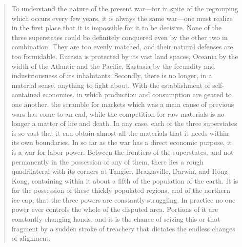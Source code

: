 \begin{quotation}
To understand the nature of the present war---for in spite of the
regrouping which occurs every few years, it is always the same war---one
must realize in the first place that it is impossible for it to be
decisive. None of the three superstates could be definitely conquered
even by the other two in combination. They are too evenly matched, and
their natural defenses are too formidable. Eurasia is protected by its
vast land spaces, Oceania by the width of the Atlantic and the Pacific,
Eastasia by the fecundity and industriousness of its inhabitants.
Secondly, there is no longer, in a material sense, anything to fight
about. With the establishment of self-contained economies, in which
production and consumption are geared to one another, the scramble for
markets which was a main cause of previous wars has come to an end,
while the competition for raw materials is no longer a matter of life
and death. In any case, each of the three superstates is so vast that it
can obtain almost all the materials that it needs within its own
boundaries. In so far as the war has a direct economic purpose, it is a
war for labor power. Between the frontiers of the superstates, and not
permanently in the possession of any of them, there lies a rough
quadrilateral with its corners at Tangier, Brazzaville, Darwin, and Hong
Kong, containing within it about a fifth of the population of the earth.
It is for the possession of these thickly populated regions, and of the
northern ice cap, that the three powers are constantly struggling. In
practice no one power ever controls the whole of the disputed area.
Portions of it are constantly changing hands, and it is the chance of
seizing this or that fragment by a sudden stroke of treachery that
dictates the endless changes of alignment.
\end{quotation}

